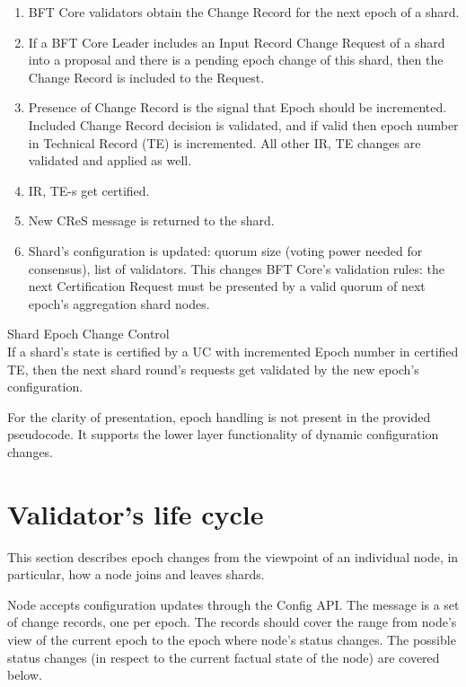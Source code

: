 \begin{enumerate}
  \item BFT Core validators obtain the Change Record for the next epoch of a shard.
  \item If a BFT Core Leader includes an Input Record Change Request of a shard into a proposal and there is a pending epoch change of this shard, then the Change Record is included to the Request.
  \item Presence of Change Record is the signal that Epoch should be incremented. Included Change Record decision is validated, and if valid then epoch number in Technical Record (TE) is incremented. All other IR, TE changes are validated and applied as well.
  \item IR, TE-s get certified.
  \item New CReS message is returned to the shard.
  \item Shard's configuration is updated: quorum size (voting power needed for consensus), list of validators. This changes BFT Core's validation rules: the next Certification Request must be presented by a valid quorum of next epoch's aggregation shard nodes.
\end{enumerate}

\begin{ruledef*}{Shard Epoch Change Control} \\
  If a shard's state is certified by a UC with incremented Epoch number in certified TE, then the next shard round's requests get validated by the new epoch's configuration.
\end{ruledef*}

For the clarity of presentation, epoch handling is not present in the provided pseudocode. It supports the lower layer functionality of dynamic configuration changes.


\section{Validator's life cycle}

This section describes epoch changes from the viewpoint of an individual node, in particular, how a node joins and leaves shards.

Node accepts configuration updates through the Config API. The message is a set of change records, one per epoch. The records should cover the range from node's view of the current epoch to the epoch where node's status changes. The possible status changes (in respect to the current factual state of the node) are covered below.

